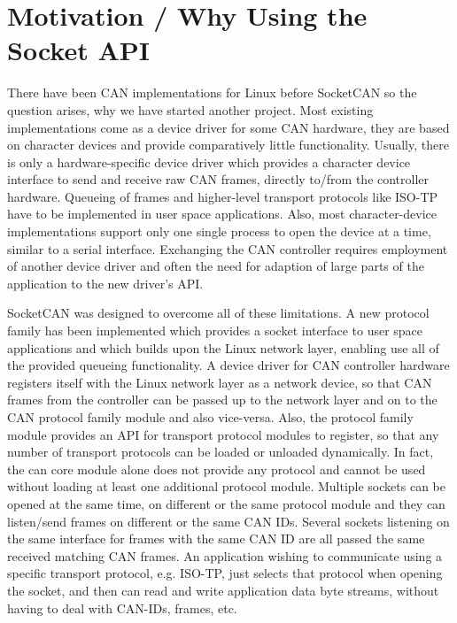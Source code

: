 \documentclass[a4paper,8pt,english]{sphinxmanual}
\begin{document}
\section{Motivation / Why Using the Socket API}
\label{networking/can:socketcan-motivation}\label{networking/can:motivation-why-using-the-socket-api}
There have been CAN implementations for Linux before SocketCAN so the
question arises, why we have started another project.  Most existing
implementations come as a device driver for some CAN hardware, they
are based on character devices and provide comparatively little
functionality.  Usually, there is only a hardware-specific device
driver which provides a character device interface to send and
receive raw CAN frames, directly to/from the controller hardware.
Queueing of frames and higher-level transport protocols like ISO-TP
have to be implemented in user space applications.  Also, most
character-device implementations support only one single process to
open the device at a time, similar to a serial interface.  Exchanging
the CAN controller requires employment of another device driver and
often the need for adaption of large parts of the application to the
new driver's API.

SocketCAN was designed to overcome all of these limitations.  A new
protocol family has been implemented which provides a socket interface
to user space applications and which builds upon the Linux network
layer, enabling use all of the provided queueing functionality.  A device
driver for CAN controller hardware registers itself with the Linux
network layer as a network device, so that CAN frames from the
controller can be passed up to the network layer and on to the CAN
protocol family module and also vice-versa.  Also, the protocol family
module provides an API for transport protocol modules to register, so
that any number of transport protocols can be loaded or unloaded
dynamically.  In fact, the can core module alone does not provide any
protocol and cannot be used without loading at least one additional
protocol module.  Multiple sockets can be opened at the same time,
on different or the same protocol module and they can listen/send
frames on different or the same CAN IDs.  Several sockets listening on
the same interface for frames with the same CAN ID are all passed the
same received matching CAN frames.  An application wishing to
communicate using a specific transport protocol, e.g. ISO-TP, just
selects that protocol when opening the socket, and then can read and
write application data byte streams, without having to deal with
CAN-IDs, frames, etc.
\end{document}
